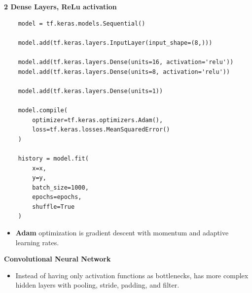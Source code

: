 \documentclass{article}
\begin{document}
\textbf{2 Dense Layers, ReLu activation}
\begin{verbatim}
    model = tf.keras.models.Sequential()

    model.add(tf.keras.layers.InputLayer(input_shape=(8,)))

    model.add(tf.keras.layers.Dense(units=16, activation='relu'))
    model.add(tf.keras.layers.Dense(units=8, activation='relu'))

    model.add(tf.keras.layers.Dense(units=1))

    model.compile(
        optimizer=tf.keras.optimizers.Adam(),
        loss=tf.keras.losses.MeanSquaredError()
    )

    history = model.fit(
        x=x,
        y=y,
        batch_size=1000,
        epochs=epochs,
        shuffle=True
    )
\end{verbatim}
\begin{itemize}
    \item \textbf{Adam} optimization is gradient descent with momentum and adaptive learning rates.
\end{itemize}
\textbf{Convolutional Neural Network}
\begin{itemize}
    \item Instead of having only activation functions as bottlenecks, has more complex hidden layers with pooling, stride, padding, and filter.
\end{itemize}
\end{document}
